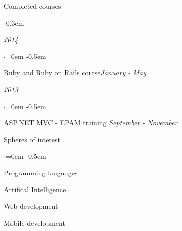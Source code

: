 \documentclass{resume} %
\begin{document}

\begin{rSection}{Completed courses}

\begin{description} \itemsep -0.3em
  \item[RubyRoid Labs]\hfill {\em 2014}
  \begin{list}{$\cdot$}{\leftmargin=0em} %
    \itemsep -0.5em \vspace{-0.5em} %
    \item Ruby and Ruby on Rails course\hfill {\em January - May}
  \end{list}
  \item[EPAM Systems]\hfill {\em 2013}
  \begin{list}{$\cdot$}{\leftmargin=0em} %
    \itemsep -0.5em \vspace{-0.5em} %
    \item ASP.NET MVC - EPAM training \hfill {\em  September - November}
  \end{list}
\end{description}

\end{rSection}


\begin{rSection}{Spheres of interest}
  \smallskip
  \begin{list}{$\cdot$}{\leftmargin=0em} %
    \itemsep -0.5em \vspace{-0.5em} %
  \item Programming languages
  \item Artifical Intelligence
  \item Web development
  \item Mobile development
  \end{list}
\end{rSection}

\end{document}

